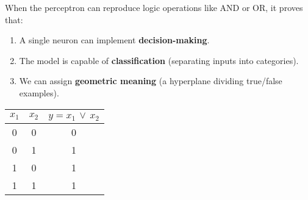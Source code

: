 \highspace
When the perceptron can reproduce logic operations like AND or OR, it proves that:
\begin{enumerate}
    \item A single neuron can implement \textbf{decision-making}.
    \item The model is capable of \textbf{classification} (separating inputs into categories).
    \item We can assign \textbf{geometric meaning} (a hyperplane dividing true/false examples).
\end{enumerate}

\highspace
\begin{examplebox}
    \begin{center}
        \begin{tabular}{@{} c c c @{}}
            \toprule
            $x_{1}$ & $x_{2}$ & $y = x_{1} \, \lor \, x_{2}$ \\
            \midrule
            0 & 0 & 0 \\
            0 & 1 & 1 \\
            1 & 0 & 1 \\
            1 & 1 & 1 \\
            \bottomrule
        \end{tabular}
    \end{center}


\end{examplebox}

